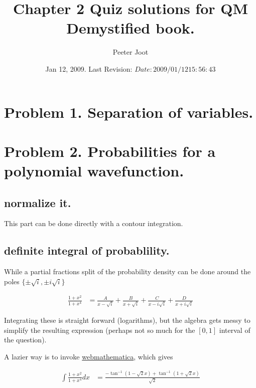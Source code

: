 \documentclass{article}
\title{ Chapter 2 Quiz solutions for QM Demystified book. }
\author{Peeter Joot}
\date{ Jan 12, 2009.  Last Revision: $Date: 2009/01/12 15:56:43 $ }
\begin{document}
\maketitle{}

\section{ Problem 1. Separation of variables. }
\section{ Problem 2. Probabilities for a polynomial wavefunction. }

\subsection{ normalize it. }

This part can be done directly with a contour integration.

\subsection{ definite integral of probablility. }

While a partial fractions split of the probability density can be done
around the poles $\{\pm\sqrt{i}, \pm i \sqrt{i}\}$

\begin{align*}
\frac{1 + x^2}{1 + x^4} &=
\frac{A}{x -\sqrt{i}}
+\frac{B}{x +\sqrt{i}}
+\frac{C}{x -i\sqrt{i}}
+\frac{D}{x +i\sqrt{i}}
\end{align*}

Integrating these is straight forward (logarithms), but
the algebra gets messy to simplify the resulting expression (perhaps not so
much for the $[0,1]$ interval of the question).

A lazier way is to invoke \href{http://integrals.wolfram.com/index.jsp}{webmathematica}, which gives

\begin{align*}
\int \frac{1 + x^2}{1 + x^4} dx &=
\frac{-\tan^{-1}(1 - \sqrt{2} x) + \tan^{-1}(1 + \sqrt{2} x)}{ \sqrt{2} }
\end{align*}



\end{document}
